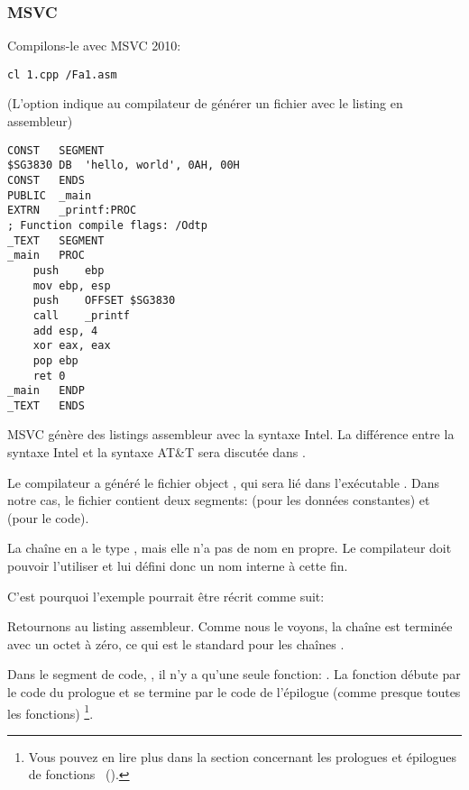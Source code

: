 \subsubsection{MSVC}

Compilons-le avec MSVC 2010:

\begin{lstlisting}
cl 1.cpp /Fa1.asm
\end{lstlisting}

(L'option  indique au compilateur de générer un fichier avec le listing en assembleur)

\begin{lstlisting}[caption=MSVC 2010,style=customasmx86]
CONST	SEGMENT
$SG3830	DB	'hello, world', 0AH, 00H
CONST	ENDS
PUBLIC	_main
EXTRN	_printf:PROC
; Function compile flags: /Odtp
_TEXT	SEGMENT
_main	PROC
	push	ebp
	mov	ebp, esp
	push	OFFSET $SG3830
	call	_printf
	add	esp, 4
	xor	eax, eax
	pop	ebp
	ret	0
_main	ENDP
_TEXT	ENDS
\end{lstlisting}

MSVC génère des listings assembleur avec la syntaxe Intel.
La différence entre la syntaxe Intel et la syntaxe AT\&T sera discutée dans .

Le compilateur a généré le fichier object , qui sera lié dans l'exécutable .
Dans notre cas, le fichier contient deux segments:  (pour les données constantes)
 et  (pour le code).

\label{string_is_const_char}
La chaîne  en \CCpp a le type , mais
elle n'a pas de nom en propre.
Le compilateur doit pouvoir l'utiliser et lui défini donc un nom interne  à cette fin.

C'est pourquoi l'exemple pourrait être récrit comme suit:



Retournons au listing assembleur. Comme nous le voyons, la chaîne est terminée avec un octet à zéro, ce qui
est le standard pour les chaînes \CCpp.

Dans le segment de code, , il n'y a qu'une seule fonction: \main{}.
La fonction \main débute par le code du prologue et se termine par le code de l'épilogue 
(comme presque toutes les fonctions)
\footnote{Vous pouvez en lire plus dans la section concernant les prologues et épilogues de
fonctions ~().}.

